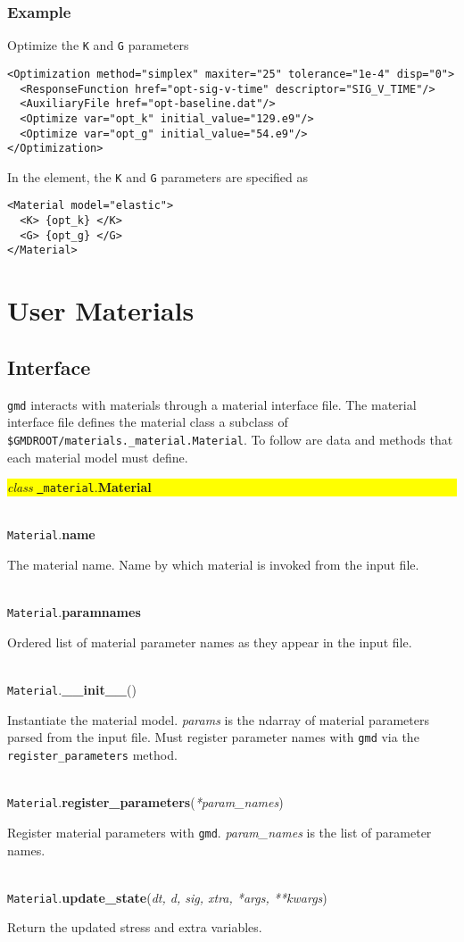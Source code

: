 \documentclass[11pt]{report}
\newcommand{\gmd}{\texttt{gmd}}
\newcommand{\ttnoindent}[1]{\noindent\texttt{#1}}
\newcommand{\data}[3]{\ttnoindent{#1}.\textbf{#2}\\%
  \indent\begin{minipage}{.9\textwidth}#3\end{minipage}}
\newcommand{\class}[2]{\noindent\colorbox{yellow}{%
    \begin{minipage}{\textwidth}%
      \emph{class} \texttt{#1}.\textbf{#2}%
    \end{minipage}}}
\newcommand{\method}[4]{\ttnoindent{#1}.\textbf{#2}(\emph{#3})\\%
  \indent\begin{minipage}{.9\textwidth}#4\end{minipage}}
\newcommand{\reqdtag}[1]{\Red{\texttt{<#1>}}}
\begin{document}
\subsection{Example}
Optimize the \texttt{K} and \texttt{G} parameters
\begin{verbatim}
<Optimization method="simplex" maxiter="25" tolerance="1e-4" disp="0">
  <ResponseFunction href="opt-sig-v-time" descriptor="SIG_V_TIME"/>
  <AuxiliaryFile href="opt-baseline.dat"/>
  <Optimize var="opt_k" initial_value="129.e9"/>
  <Optimize var="opt_g" initial_value="54.e9"/>
</Optimization>
\end{verbatim}

In the \reqdtag{Material} element, the \texttt{K} and \texttt{G} parameters
are specified as
%
\begin{verbatim}
<Material model="elastic">
  <K> {opt_k} </K>
  <G> {opt_g} </G>
</Material>
\end{verbatim}

\chapter{User Materials}
\label{chap:usrmtl}

\section{Interface}
\label{sec:usrint}
\gmd{} interacts with materials through a material interface file. The
material interface file defines the material class a subclass of\\
\verb|$GMDROOT/materials._material.Material|.  To follow are data and methods
that each material model must define.\\[5pt]

\class{\underline{  }material}{Material} \\[5pt]
\data{Material}{name}{The material name. Name by which material is invoked
  from the input file.}\\
\data{Material}{param\textunderscore{}names}{Ordered list of material
  parameter names as they appear in the input file.}\\
\method{Material}{\_\_init\_\_}{}{Instantiate the material model.
  \emph{params} is the ndarray of material parameters parsed from the input
  file. Must register parameter names with \gmd{} via the
  \texttt{register\_parameters} method.}\\
\method{Material}{register\_parameters}{*param\_names}{Register material
  parameters with \gmd{}. \emph{param\_names} is the list of parameter
  names.}\\
\method{Material}{update\_state}{dt, d, sig, xtra, *args, **kwargs}{%
  Return the updated stress and extra variables.}
\end{document}
